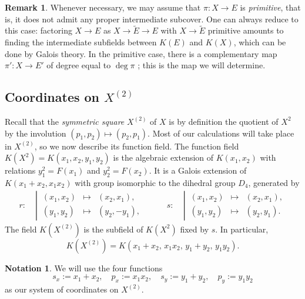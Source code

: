 \documentclass[a4paper,twoside,english]{amsart}
\theoremstyle{plain}
\theoremstyle{definition}
\newtheorem{remark}[theorem]{Remark}
\newtheorem{notation}[theorem]{Notation}
\begin{document}
\begin{remark}
    Whenever necessary, we may assume that $\pi\colon X \to E$ is \emph{primitive}, that is, it does not admit any proper intermediate subcover. One can always reduce to this case: factoring $X \to E$ as $X \to \tilde{E} \to E$ with $X \to \tilde{E}$ primitive amounts to finding the intermediate subfields between $K(E)$ and $K(X)$, which can be done by Galois theory. In the primitive case, there is a complementary map $\pi' : X \to E'$ 
    of degree equal to $\deg \pi$ \cite[p.~155]{freyCurvesGenus21991}; this is the map we will determine.
\end{remark}










\subsection{Coordinates on \texorpdfstring{$X^{(2)}$}{X^(2)}}
\label{section: coordinates}
Recall that the \emph{symmetric square} $X^{(2)}$ of $X$ is by definition the quotient of $X^2$ by the involution $(p_1, p_2) \mapsto (p_2, p_1)$. Most of our calculations will take place in $X^{(2)}$, so we now describe its function field. The function field $K(X^2)=K(x_1, x_2, y_1, y_2)$ is the algebraic extension of $K(x_1, x_2)$ with relations $y_1^2=F(x_1)$ and $y_2^2 = F(x_2)$.
It is a Galois extension of $K(x_1+x_2, x_1x_2)$ with group isomorphic to the dihedral group $D_4$, generated by
\[
\begin{aligned}
r \colon\;& \left|\,
\begin{array}{rcl}
(x_1,x_2) &\mapsto& (x_2,x_1),\\
(y_1,y_2) &\mapsto& (y_2,-y_1),
\end{array}
\right.
\qquad &
s \colon\;& \left|\,
\begin{array}{rcl}
(x_1,x_2) &\mapsto& (x_2,x_1),\\
(y_1,y_2) &\mapsto& (y_2,y_1).
\end{array}
\right.
\end{aligned}
\]
The field $K(X^{(2)})$ is the subfield of $K(X^2)$ fixed by $s$. In particular,
\[
    K(X^{(2)})=K(x_1+x_2,\, x_1x_2,\, y_1+y_2,\, y_1y_2).
\]
\vspace{-0.4cm}
\begin{notation}
We will use the four functions
\[
s_x := x_1+ x_2, \quad p_x := x_1x_2, \quad s_y := y_1+y_2, \quad p_y := y_1y_2
\]
as our system of coordinates on $X^{(2)}$.
\end{notation}
\end{document}
